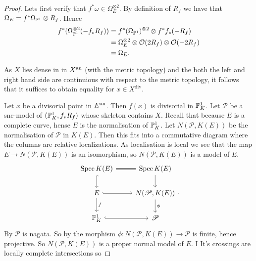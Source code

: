 \begin{proof}
	Lets first verify that $f^* \omega \in \Omega_E^{\otimes 2}$. 
	By definition of $R_f$ we have that $\Omega_E = f^*\Omega_{\mathbb{P} ^{1}} \otimes R_f$.
	Hence 
	\begin{align*}
		f^* (\Omega_{\mathbb{P}^{1}}^{\otimes 2}(-f_* R_f)) &= f^*(\Omega_{\mathbb{P}^{1}})^{\otimes 2} \otimes f^*f_*(-R_f) \\
							      &= \Omega_{E}^{\otimes 2} \otimes \mathcal{O}(2 R_f) \otimes \mathcal{O}(-2 R_f) \\
							      &= \Omega_E 
	.\end{align*}

	As $X$ lies dense in in $X{}^{\text{an}}$ (with the metric topology) and the both the left and right hand side are continuious with respect to the metric topology, it follows that it suffices to obtain equality for $x \in X^\text{div}$.

	Let $x$ be a divisorial point in $E{}^{\text{an}}$. 
	Then $f(x)$ is divisorial in $\mathbb{P}_K^{1}$. 
	Let $\mathscr{P} $ be a snc-model of $(\mathbb{P}_K^{1},f_* R_f)$ whose skeleton contains $X$.
	Recall that because $E$ is a complete curve, hense $E$ is the normalisation of $\mathbb{P}^{1}_K$.
	Let $N(\mathscr P, K(E))$ be the normalisation of $\mathscr P$ in $K(E)$. 
	Then this fits into a commutative diagram where the columns are relative localizations.
	As localisation is local we see that the map $E \to N(\mathscr P, K(E))$ is an isomorphism, so  $N(\mathscr P, K(E))$ is a model of $E$. 
	\[
	\begin{tikzcd}
		\spec K(E) \rar[equals] \dar[hookrightarrow]  & \spec K(E) \dar\\
		E \rar[hookrightarrow] \dar{f} & N(\mathscr P, K(E)) \dar{\phi} \\
		\pro^{1}_K \rar[hookrightarrow] & \mathscr P
	\end{tikzcd}
	.\] 
	By   $\mathscr P$ is nagata.
	So by  the morphism $\phi: N(\mathscr P, K(E)) \to \mathscr P$ is finite, hence projective. 
	So $N(\mathscr P, K(E))$ is a proper normal model of $E$. 
	I
	It's crossings are locally complete intersections so  


\end{proof}
